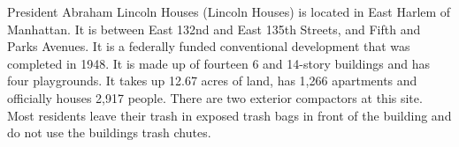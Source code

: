 President Abraham Lincoln Houses (Lincoln Houses) is located in East Harlem of Manhattan. It is between East 132nd and East 135th Streets, and Fifth and Parks Avenues. It is a federally funded conventional development that was completed in 1948. It is made up of fourteen 6 and 14-story buildings and has four playgrounds. It takes up 12.67 acres of land,  has 1,266 apartments and officially houses 2,917 people. There are two exterior compactors at this site. Most residents leave their trash in exposed trash bags in front of the building and do not use the buildings trash chutes. 